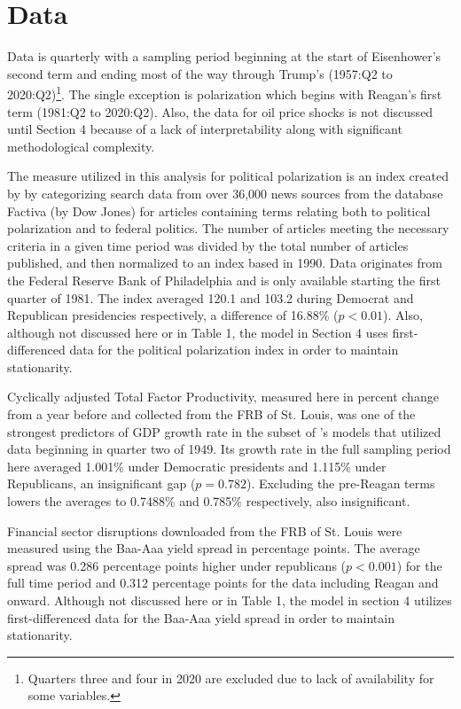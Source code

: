 \documentclass[a4paper, 12pt]{article}
\begin{document}
\section{Data}
Data is quarterly with a sampling period beginning at the start of Eisenhower’s second term and ending most of the way through Trump’s (1957:Q2 to 2020:Q2)\footnote{Quarters three and four in 2020 are excluded due to lack of availability for some variables.}. The single exception is polarization which begins with Reagan’s first term (1981:Q2 to 2020:Q2). Also, the data for oil price shocks is not discussed until Section 4 because of a lack of interpretability along with significant methodological complexity. \par

The measure utilized in this analysis for political polarization is an index created by  by categorizing search data from over 36,000 news sources from the database Factiva (by Dow Jones) for articles containing terms relating both to political polarization and to federal politics. The number of articles meeting the necessary criteria in a given time period was divided by the total number of articles published, and then normalized to an index based in 1990. Data originates from the Federal Reserve Bank of Philadelphia and is only available starting the first quarter of 1981. The index averaged 120.1 and 103.2 during Democrat and Republican presidencies respectively, a difference of 16.88\% ($p < 0.01$). Also, although not discussed here or in Table 1, the model in Section 4 uses first-differenced data for the political polarization index in order to maintain stationarity.\par

Cyclically adjusted Total Factor Productivity, measured here in percent change from a year before and collected from the FRB of St. Louis, was one of the strongest predictors of GDP growth rate in the subset of \citeauthor{blinderwatson2016}’s models that utilized data beginning in quarter two of 1949. Its growth rate in the full sampling period here averaged 1.001\% under Democratic presidents and 1.115\% under Republicans, an insignificant gap ($p = 0.782$). Excluding the pre-Reagan terms lowers the averages to 0.7488\% and 0.785\% respectively, also insignificant. \par

Financial sector disruptions downloaded from the FRB of St. Louis were measured using the Baa-Aaa yield spread in percentage points. The average spread was 0.286 percentage points higher under republicans ($p < 0.001$) for the full time period and 0.312 percentage points for the data including Reagan and onward. Although not discussed here or in Table 1, the model in section 4 utilizes first-differenced data for the Baa-Aaa yield spread in order to maintain stationarity. \par
\end{document}
